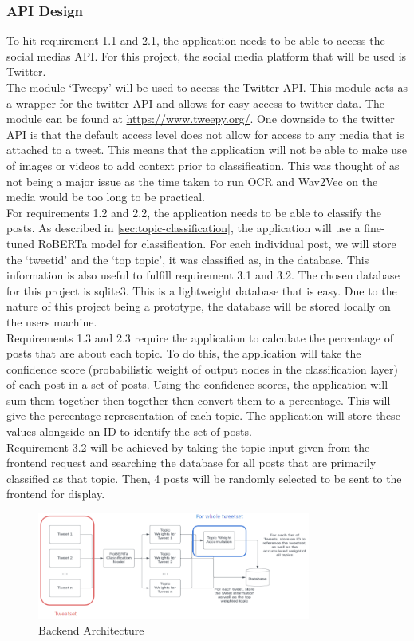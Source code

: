 \subsubsection{API Design}
To hit requirement 1.1 and 2.1, the application needs to be able to access the social medias API. For this project, the social media
platform that will be used is Twitter.\\
The module `Tweepy' will be used to access the Twitter API. This module acts as a wrapper for the twitter API and allows for easy
access to twitter data. The module can be found at \url{https://www.tweepy.org/}. One downside to the twitter API is that the default
access level does not allow for access to any media that is attached to a tweet. This means that the application will not be able to
make use of images or videos to add context prior to classification. This was thought of as not being a major issue as the time taken
to run OCR and Wav2Vec on the media would be too long to be practical.\\

For requirements 1.2 and 2.2, the application needs to be able to classify the posts. As described in \cref{sec:topic-classification},
the application will use a fine-tuned RoBERTa model for classification. For each individual post, we will store the `tweetid' and the
`top topic', it was classified as, in the database. This information is also useful to fulfill requirement 3.1 and 3.2. The chosen database
for this project is sqlite3. This is a lightweight database that is easy. Due to the nature of this project being a prototype, the database
will be stored locally on the users machine.\\

Requirements 1.3 and 2.3 require the application to calculate the percentage of posts that are about each topic. To do this, the application
will take the confidence score (probabilistic weight of output nodes in the classification layer) of each post in a set of posts. Using the
confidence scores, the application will sum them together then together then convert them to a percentage. This will give the percentage
representation of each topic. The application will store these values alongside an ID to identify the set of posts.\\

Requirement 3.2 will be achieved by taking the topic input given from the frontend request and searching the database for all posts that
are primarily classified as that topic. Then, 4 posts will be randomly selected to be sent to the frontend for display.
\begin{figure}[hbtp]
    \centering
    \includegraphics[width=0.8\textwidth]{../images/backend.png}
    \caption{Backend Architecture}
    \label{fig:backend}
\end{figure}

